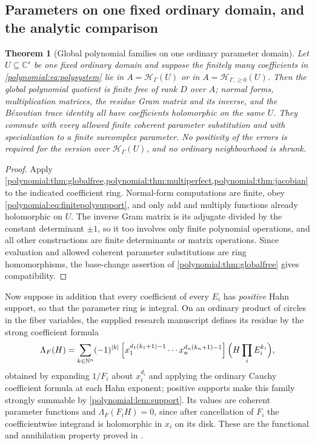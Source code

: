 \documentclass[11pt,letterpaper]{article}
\numberwithin{equation}{section}
\newtheorem{theorem}{Theorem}[section]
\theoremstyle{definition}
\theoremstyle{remark}\newtheorem{remark}[theorem]{Remark}
\newcommand{\C}{\mathbb C}
\newcommand{\N}{\mathbb N}
\newcommand{\HH}{\mathscr H_\Gamma}
\newcommand{\HHn}{\mathscr H_{\Gamma,\ge0}}
\begin{document}
\subsection{Parameters on one fixed ordinary domain, and the analytic
comparison}
\begin{theorem}[Global polynomial families on one ordinary parameter domain]
\label{polynomial:thm:polyparameters}
Let $U\subseteq\C^s$ be one fixed ordinary domain and suppose the finitely
many coefficients in \eqref{polynomial:eq:polysystem} lie in $A=\HH(U)$ or in
$A=\HHn(U)$. Then the global polynomial quotient is finite free of rank $D$
over $A$; normal forms, multiplication matrices, the residue Gram matrix
\emph{and its inverse}, and the B\'ezoutian trace identity all have
coefficients holomorphic on the same $U$. They commute with every allowed
finite coherent parameter substitution and with specialization to a finite
surcomplex parameter. No positivity of the errors is required for the version
over $\HH(U)$, and no ordinary neighbourhood is shrunk.
\end{theorem}
\begin{proof}
Apply
\cref{polynomial:thm:globalfree,polynomial:thm:multiperfect,polynomial:thm:jacobian}
to the indicated coefficient ring. Normal-form computations are finite, obey
\eqref{polynomial:eq:finitepolysupport}, and only add and multiply functions
already holomorphic on $U$. The inverse Gram matrix is its adjugate divided by
the constant determinant $\pm1$, so it too involves only finite polynomial
operations, and all other constructions are finite determinants or matrix
operations. Since evaluation and allowed coherent parameter substitutions are
ring homomorphisms, the base-change assertion of
\cref{polynomial:thm:globalfree} gives compatibility.
\end{proof}

Now suppose in addition that every coefficient of every $E_i$ has
\emph{positive} Hahn support, so that the parameter ring is integral. On an
ordinary product of circles in the fiber variables, the supplied research
manuscript defines its residue by the strong coefficient formula
\begin{equation}\label{polynomial:eq:sourceLambda}
 \Lambda_F(H)=\sum_{k\in\N^n}(-1)^{|k|}
 \left[x_1^{d_1(k_1+1)-1}\cdots x_n^{d_n(k_n+1)-1}\right]
 \Bigl(H\prod_iE_i^{k_i}\Bigr),
\end{equation}
obtained by expanding $1/F_i$ about $x_i^{d_i}$ and applying the ordinary
Cauchy coefficient formula at each Hahn exponent; positive supports make this
family strongly summable by \cref{polynomial:lem:support}. Its values are
coherent parameter functions and $\Lambda_F(F_iH)=0$, since after cancellation
of $F_i$ the coefficientwise integrand is holomorphic in $x_i$ on its disk.
These are the functional and annihilation property proved in
\cite{polynomial:SourceResearch}.
\end{document}
